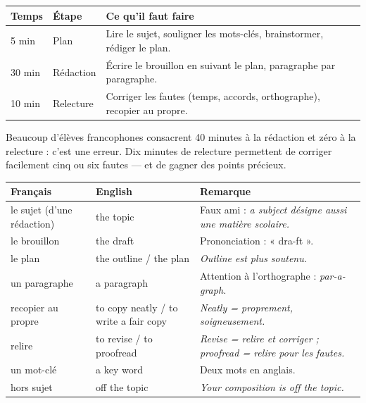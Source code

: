 \documentclass[11pt]{article}
\newcommand{\eng}[1]{\ifmmode\text{\textit{#1}}\else\begingroup\selectlanguage{english}\itshape #1\endgroup\fi}
\begin{document}
\begin{center}
\begin{tabularx}{\linewidth}{|l|X|X|}
\hline
\rowcolor{popblueL} \textbf{Temps} & \textbf{Étape} & \textbf{Ce qu'il faut faire} \\
\hline
5 min & Plan & Lire le sujet, souligner les mots-clés, brainstormer, rédiger le plan. \\
\hline
30 min & Rédaction & Écrire le brouillon en suivant le plan, paragraphe par paragraphe. \\
\hline
10 min & Relecture & Corriger les fautes (temps, accords, orthographe), recopier au propre. \\
\hline
\end{tabularx}
\end{center}

Beaucoup d'élèves francophones consacrent 40 minutes à la rédaction et zéro à la relecture : c'est une erreur. Dix minutes de relecture permettent de corriger facilement cinq ou six fautes --- et de gagner des points précieux.

\begin{center}
\begin{tabularx}{\linewidth}{|X|X|X|}
\hline
\rowcolor{popblueL} \textbf{Français} & \textbf{English} & \textbf{Remarque} \\
\hline
le sujet (d'une rédaction) & the topic & Faux ami : \eng{a subject} désigne aussi une matière scolaire. \\
\hline
le brouillon & the draft & Prononciation : « dra-ft ». \\
\hline
le plan & the outline / the plan & \eng{Outline} est plus soutenu. \\
\hline
un paragraphe & a paragraph & Attention à l'orthographe : \eng{par-a-graph}. \\
\hline
recopier au propre & to copy neatly / to write a fair copy & \eng{Neatly} = proprement, soigneusement. \\
\hline
relire & to revise / to proofread & \eng{Revise} = relire et corriger ; \eng{proofread} = relire pour les fautes. \\
\hline
un mot-clé & a key word & Deux mots en anglais. \\
\hline
hors sujet & off the topic & \eng{Your composition is off the topic.} \\
\hline
\end{tabularx}
\end{center}
\end{document}
